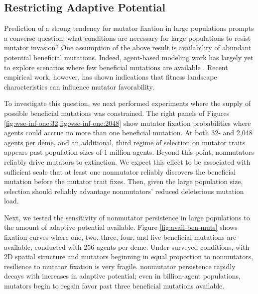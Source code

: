 \subsection{Restricting Adaptive Potential}
\label{sec:restricting-adaptive-potential}

Prediction of a strong tendency for mutator fixation in large populations prompts a converse question: what conditions are necessary for large populations to resist mutator invasion?
One assumption of the above result is availability of abundant potential beneficial mutations.
Indeed, agent-based modeling work has largely yet to explore scenarios where few beneficial mutations are available \citep{raynes2013effect,raynes2018sign,raynes2019selection,raynes2019migration}.
Recent empirical work, however, has shown indications that fitness landscape characteristics can influence mutator favorability.

To investigate this question, we next performed experiments where the supply of possible beneficial mutations was constrained.
The right panels of Figures \cref{fig:wse-inf-one:32,fig:wse-inf-one:2048} show mutator fixation probabilities where agents could accrue no more than one beneficial mutation.
At both 32- and 2,048 agents per deme, and an additional, third regime of selection on mutator traits appears past population sizes of 1 million agents.
Beyond this point, nonmutators reliably drive mutators to extinction.
We expect this effect to be associated with sufficient scale that at least one nonmutator reliably discovers the beneficial mutation before the mutator trait fixes.
Then, given the large population size, selection should reliably advantage nonmutators' reduced deleterious mutation load.



Next, we tested the sensitivity of nonmutator persistence in large populations to the amount of adaptive potential available.
Figure \ref{fig:avail-ben-muts} shows fixation curves where one, two, three, four, and five beneficial mutations are available, conducted with 256 agents per deme.
Under surveyed conditions, with 2D spatial structure and mutators beginning in equal proportion to nonmutators, resilience to mutator fixation is very fragile.
nonmutator persistence rapidly decays with increases in adaptive potential;
even in billion-agent populations, mutators begin to regain favor past three beneficial mutations available.



